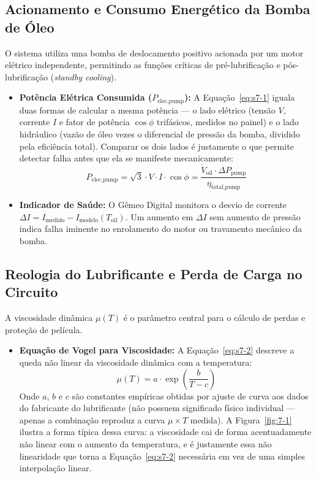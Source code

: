 \documentclass[12pt,a4paper]{article}
\numberwithin{equation}{section}
\numberwithin{table}{section}
\numberwithin{figure}{section}
\begin{document}
{	\subsection{\textbf{Acionamento e Consumo Energético da Bomba de Óleo}}
	O sistema utiliza uma bomba de deslocamento positivo acionada por um motor elétrico independente, permitindo as funções críticas de pré-lubrificação e pós-lubrificação (\textit{standby cooling}).
	\begin{itemize}
		\item \textbf{Potência Elétrica Consumida ($P_{\text{elec,pump}}$):} A Equação~\eqref{eq:s7-1} iguala duas formas de calcular a mesma potência — o lado elétrico (tensão $V$, corrente $I$ e fator de potência $\cos\phi$ trifásicos, medidos no painel) e o lado hidráulico (vazão de óleo vezes o diferencial de pressão da bomba, dividido pela eficiência total). Comparar os dois lados é justamente o que permite detectar falha antes que ela se manifeste mecanicamente:
		\begin{equation}\label{eq:s7-1}
 P_{\text{elec,pump}} = \sqrt{3} \cdot V \cdot I \cdot \cos \phi = \frac{\dot{V}_{\text{oil}} \cdot \Delta P_{\text{pump}}}{\eta_{\text{total,pump}}}
\end{equation}
		\item \textbf{Indicador de Saúde:} O Gêmeo Digital monitora o desvio de corrente $\Delta I = I_{\text{medido}} - I_{\text{modelo}}(T_{\text{oil}})$. Um aumento em $\Delta I$ sem aumento de pressão indica falha iminente no enrolamento do motor ou travamento mecânico da bomba.
	\end{itemize}
	
	\subsection{\textbf{Reologia do Lubrificante e Perda de Carga no Circuito}}
	A viscosidade dinâmica $\mu(T)$ é o parâmetro central para o cálculo de perdas e proteção de película.
	\begin{itemize}
		\item \textbf{Equação de Vogel \cite{vogel} para Viscosidade:} A Equação~\eqref{eq:s7-2} descreve a queda não linear da viscosidade dinâmica com a temperatura:
		\begin{equation}\label{eq:s7-2}
 \mu(T) = a \cdot \exp \left( \frac{b}{T - c} \right) 
\end{equation}
		Onde $a$, $b$ e $c$ são constantes empíricas obtidas por ajuste de curva aos dados do fabricante do lubrificante (não possuem significado físico individual — apenas a combinação reproduz a curva $\mu \times T$ medida). A Figura~\ref{fig:7-1} ilustra a forma típica dessa curva: a viscosidade cai de forma acentuadamente não linear com o aumento da temperatura, e é justamente essa não linearidade que torna a Equação~\eqref{eq:s7-2} necessária em vez de uma simples interpolação linear.


\end{itemize}}
\end{document}
